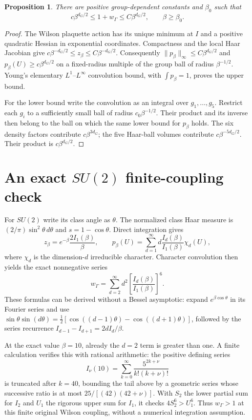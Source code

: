 \documentclass{article}
\newtheorem{proposition}{Proposition}
\begin{document}
\begin{proposition}
There are positive group-dependent constants and $\beta_0$ such that
\[
 c\beta^{d_G/2}\leq1+w_\Gamma\leq C\beta^{d_G/2},\qquad\beta\geq\beta_0.
 \tag{4}
\]
\end{proposition}
\begin{proof}
The Wilson plaquette action has its unique minimum at $I$ and a positive quadratic Hessian in exponential coordinates. Compactness and the local Haar Jacobian give
$c\beta^{-d_G/2}\leq z_\beta\leq C\beta^{-d_G/2}$. Consequently $\|p_\beta\|_\infty\leq C\beta^{d_G/2}$ and $p_\beta(U)\geq c\beta^{d_G/2}$ on a fixed-radius multiple of the group ball of radius $\beta^{-1/2}$. Young's elementary $L^1$--$L^\infty$ convolution bound, with $\int p_\beta=1$, proves the upper bound.

For the lower bound write the convolution as an integral over $g_1,\ldots,g_5$. Restrict each $g_i$ to a sufficiently small ball of radius $c_0\beta^{-1/2}$. Their product and its inverse then belong to the ball on which the same lower bound for $p_\beta$ holds. The six density factors contribute $c\beta^{3d_G}$; the five Haar-ball volumes contribute $c\beta^{-5d_G/2}$. Their product is $c\beta^{d_G/2}$.
\end{proof}

\section{An exact $SU(2)$ finite-coupling check}
For $SU(2)$ write its class angle as $\theta$. The normalized class Haar measure is $(2/\pi)\sin^2\theta\,d\theta$ and $s=1-\cos\theta$. Direct integration gives
\[
 z_\beta=e^{-\beta}\frac{2I_1(\beta)}{\beta},\qquad
 p_\beta(U)=\sum_{d=1}^{\infty}
 d\frac{I_d(\beta)}{I_1(\beta)}\chi_d(U),
 \tag{5}
\]
where $\chi_d$ is the dimension-$d$ irreducible character. Character convolution then yields the exact nonnegative series
\[
 w_\Gamma=\sum_{d=2}^{\infty}d^2
 \left[\frac{I_d(\beta)}{I_1(\beta)}\right]^6.
 \tag{6}
\]
These formulas can be derived without a Bessel asymptotic: expand $e^{\beta\cos\theta}$ in its Fourier series and use $\sin\theta\sin(d\theta)=\frac12[\cos((d-1)\theta)-\cos((d+1)\theta)]$, followed by the series recurrence $I_{d-1}-I_{d+1}=2dI_d/\beta$.

At the exact value $\beta=10$, already the $d=2$ term is greater than one. A finite calculation verifies this with rational arithmetic: the positive defining series
\[
 I_\nu(10)=\sum_{k=0}^{\infty}\frac{5^{2k+\nu}}{k!(k+\nu)!}
\]
is truncated after $k=40$, bounding the tail above by a geometric series whose successive ratio is at most $25/[(42)(42+\nu)]$. With $S_2$ the lower partial sum for $I_2$ and $U_1$ the rigorous upper sum for $I_1$, it checks $4S_2^6>U_1^6$. Thus $w_\Gamma>1$ at this finite original Wilson coupling, without a numerical integration assumption.
\end{document}
